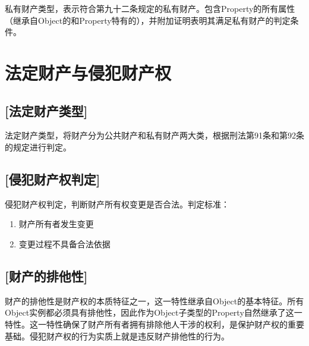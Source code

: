 \begin{definition}\label{PrivateProperty}
\leanok
{}
私有财产类型，表示符合第九十二条规定的私有财产。包含Property的所有属性（继承自Object的和Property特有的），并附加证明表明其满足私有财产的判定条件。
\end{definition}

\section{法定财产与侵犯财产权}

\subsection{[法定财产类型]}

\begin{definition}\label{LegalProperty}
\leanok
{}
法定财产类型，将财产分为公共财产和私有财产两大类，根据刑法第91条和第92条的规定进行判定。
\end{definition}

\subsection{[侵犯财产权判定]}

\begin{definition}\label{isPropertyRightsViolation}
\leanok
{}
侵犯财产权判定，判断财产所有权变更是否合法。判定标准：
\begin{enumerate}
\item 财产所有者发生变更
\item 变更过程不具备合法依据
\end{enumerate}
\end{definition}

\subsection{[财产的排他性]}

\begin{definition}\label{propertyExclusivity}
\leanok
{}
财产的排他性是财产权的本质特征之一，这一特性继承自Object的基本特征。所有Object实例都必须具有排他性，因此作为Object子类型的Property自然继承了这一特性。这一特性确保了财产所有者拥有排除他人干涉的权利，是保护财产权的重要基础。侵犯财产权的行为实质上就是违反财产排他性的行为。
\end{definition}
